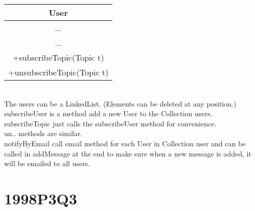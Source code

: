 \documentclass[10pt,twoside,a4paper]{article}
\begin{document}
\begin{enumerate}
\begin{enumerate}
\begin{tabular}{|c|}
\hline 
User \\ 
\hline 
... \\ 
\hline 
... \\ 
+subscribeTopic(Topic t) \\ 
+unsubscribeTopic(Topic t) \\ 
\hline 
\end{tabular} \\
The users can be a LinkedList. (Elements can be deleted at any position.)\\
subscribeUser is a method add a new User to the Collection users.\\
subscribeTopic just calls the subscribeUser method for convenience.\\
un.. methods are similar.\\
notifyByEmail call email method for each User in Collection user and can be called in addMessage at the end to make sure when a new message is added, it will be emailed to all users.
\end{enumerate}
\end{enumerate}

\section{1998P3Q3}
\end{document}
